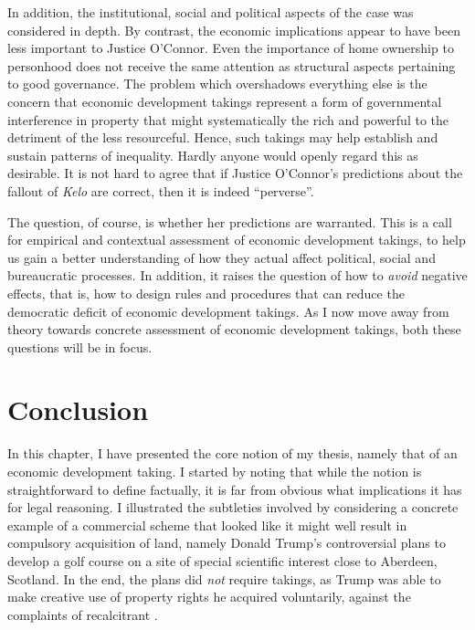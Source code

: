In addition, the institutional, social and political aspects of the case was considered in depth. By contrast, the economic implications appear to have been less important to Justice O'Connor. Even the importance of home ownership to personhood does not receive the same attention as structural aspects pertaining to good governance. The problem which overshadows everything else is the concern that economic development takings represent a form of governmental interference in property that might systematically  the rich and powerful to the detriment of the less resourceful. Hence, such takings may help establish and sustain patterns of inequality. Hardly anyone would openly regard this as desirable. It is not hard to agree that if Justice O'Connor's predictions about the fallout of {\it Kelo} are correct, then it is indeed ``perverse''. 

The question, of course, is whether her predictions are warranted. This is a call for empirical and contextual assessment of economic development takings, to help us gain a better understanding of how they actual affect political, social and bureaucratic processes. In addition, it raises the question of how to {\it avoid} negative effects, that is, how to design rules and procedures that can reduce the democratic deficit of economic development takings. As I now move away from theory towards concrete assessment of economic development takings, both these questions will be in focus.

\section{Conclusion}\label{sec:conc1}

In this chapter, I have presented the core notion of my thesis, namely that of an economic development taking. I started by noting that while the notion is straightforward to define factually, it is far from obvious what implications it has for legal reasoning. I illustrated the subtleties involved by considering a concrete example of a commercial scheme that looked like it might well result in compulsory acquisition of land, namely Donald Trump's controversial plans to develop a golf course on a site of special scientific interest close to Aberdeen, Scotland. In the end, the plans did {\it not} require takings, as Trump was able to make creative use of property rights he acquired voluntarily, against the complaints of recalcitrant .

